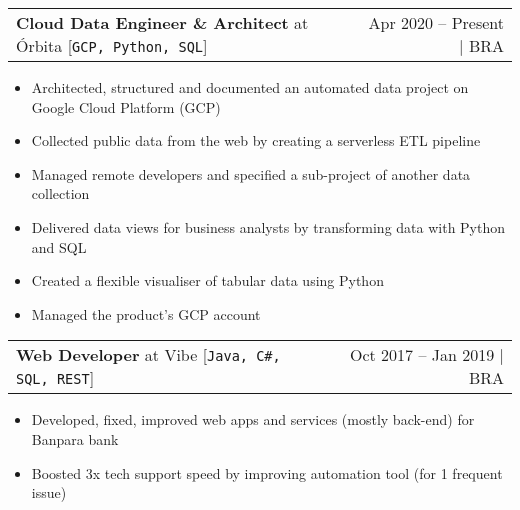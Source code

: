 \documentclass[a4paper,11pt]{article}
\makeatletter
\newcommand{\myHrefIcn}[2]{#2 \href{#1}{\scriptsize{\faExternalLink{}}}}
\newcommand{\resumeItemCustom}[1]{
  \item\small{#1 \vspace{-2pt}}
}
\newcommand{\resumeJobSubheadingD}[7]{
  \vspace{0pt}\item
    \begin{tabular*}{0.97\textwidth}{l@{\extracolsep{\fill}}r}
      \textbf{#4} at \myHrefIcn{#1}{#2} \hspace{3pt} [\small \texttt{#6}] & {\small #5}
    \end{tabular*}\vspace{-6pt}
}
\newcommand{\resumeItemListStart}{\begin{itemize}}
\newcommand{\resumeItemListEnd}{\end{itemize}\vspace{-5pt}}
\newcommand{\csharp}{C\#}
\makeatother
\begin{document}
    \resumeJobSubheadingD
      {http://orbita.srv.br/}{Órbita}{}%
      {Cloud Data Engineer \& Architect}{Apr 2020 -- Present $\vert$ BRA}
      {GCP, Python, SQL}%
      {Data platform creation, automated data integration}
      \resumeItemListStart
        \resumeItemCustom{Architected, structured and documented an automated data project on Google Cloud Platform (GCP)}
        \resumeItemCustom{Collected public data from the web by creating a serverless ETL pipeline}
        \resumeItemCustom{Managed remote developers and specified a sub-project of another data collection}
        \resumeItemCustom{Delivered data views for business analysts by transforming data with Python and SQL}
        \resumeItemCustom{Created a flexible visualiser of tabular data using Python}
        \resumeItemCustom{Managed the product's GCP account}
      \resumeItemListEnd
      
    \resumeJobSubheadingD
      {http://www.vibetecnologia.com/}{Vibe}{Technology for businesses}%
      {Web Developer}{Oct 2017 -- Jan 2019 $\vert$ BRA}
      {Java, \csharp, SQL, REST}%
      {Internet banking web apps, management systems, web services for a state bank \myHrefIcn{http://www.banpara.b.br/}{Banpara}}
      \resumeItemListStart
        \resumeItemCustom{Developed, fixed, improved web apps and services (mostly back-end) for Banpara bank}
        \resumeItemCustom{Boosted 3x tech support speed by improving automation tool (for 1 frequent issue)}
      \resumeItemListEnd
\end{document}
